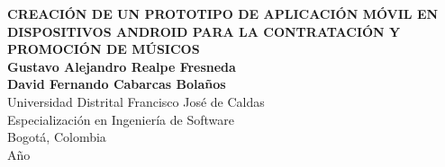 \begin{center}
\begin{figure}
\centering%
%
\end{figure}
\thispagestyle{empty} \vspace*{0.5cm} \textbf{ \LARGE
CREACIÓN DE UN PROTOTIPO DE APLICACIÓN MÓVIL EN 
DISPOSITIVOS ANDROID PARA LA CONTRATACIÓN Y PROMOCIÓN DE MÚSICOS 
}\\[3.5cm]
\Large\textbf{Gustavo Alejandro Realpe Fresneda}\\
\Large\textbf{David Fernando Cabarcas Bolaños}\\[4.5cm]
\small Universidad Distrital Francisco Jos\'{e} de Caldas\\
Especialización en Ingeniería de Software\\
Bogotá, Colombia\\
A\~{n}o \the\year\\
\end{center}
